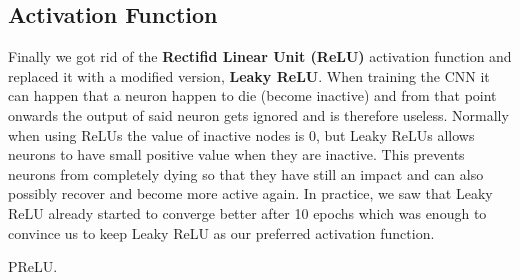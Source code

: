 \documentclass{article}
\begin{document}
	
	
	\subsection{Activation Function}
	Finally we got rid of the \textbf{Rectifid Linear Unit (ReLU)} activation function and replaced it with a modified version, \textbf{Leaky ReLU}. When training the CNN it can happen that a neuron happen to die (become inactive) and from that point onwards the output of said neuron gets ignored and is therefore useless. Normally when using ReLUs the value of inactive nodes is 0, but Leaky ReLUs allows neurons to have small positive value when they are inactive. This prevents neurons from completely dying so that they have still an impact and can also possibly recover and become more active again. In practice, we saw that Leaky ReLU already started to converge better after 10 epochs which was enough to convince us to keep Leaky ReLU as our preferred activation function. 
	
	
	
	PReLU. 

	
\end{document}
